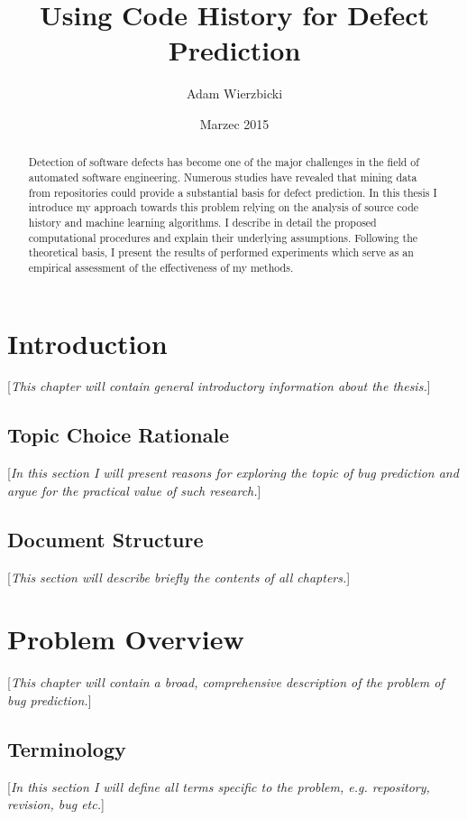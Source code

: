 \documentclass{pracamgr}
\author{Adam Wierzbicki}
\title{Using Code History for Defect Prediction}
\date{Marzec 2015}
\begin{document}
\maketitle

\begin{abstract}
Detection of software defects has become one of the major challenges in the field of automated software engineering. Numerous studies have revealed that mining data from repositories could provide a substantial basis for defect prediction. In this thesis I introduce my approach towards this problem relying on the analysis of source code history and machine learning algorithms. I describe in detail the proposed computational procedures and explain their underlying assumptions. Following the theoretical basis, I  present the results of performed experiments which serve as an empirical assessment of the effectiveness of my methods.
\end{abstract}

\tableofcontents

\chapter{Introduction}
[\textit{This chapter will contain general introductory information about the thesis.}]

\section{Topic Choice Rationale}
[\textit{In this section I will present reasons for exploring the topic of bug prediction and argue for the practical value of such research.}]

\section{Document Structure}
[\textit{This section will describe briefly the contents of all chapters.}]

\chapter{Problem Overview}
[\textit{This chapter will contain a broad, comprehensive description of the problem of bug prediction.}]

\section{Terminology}
[\textit{In this section I will define all terms specific to the problem, e.g. repository, revision, bug etc.}]
\end{document}
